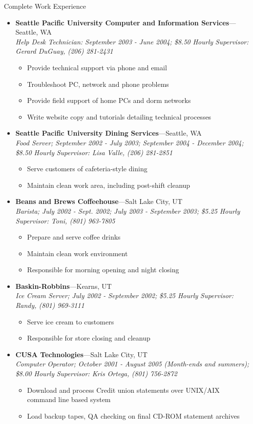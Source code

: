 \documentclass[11pt,oneside]{article}
\newenvironment{ressection}[1]{
    \vspace{4pt}
    {\fontfamily{phv}\selectfont\Large#1}
    \begin{itemize}
    \vspace{3pt}
}{
    \end{itemize}
}
\newcommand{\ressubitem}[1]{
    \vspace{-1pt}
    \item \begin{flushleft} #1 \end{flushleft}
}
\newenvironment{ressubsec}[4]{
    \item
    \textbf{#1}---#2 \\
    \textit{#3}
    \newline
    \textit{#4}
    \vspace{-2pt}
    \begin{itemize}
}{
    \end{itemize}
}
\begin{document}
\begin{ressection}{Complete Work Experience}
    \begin{ressubsec}{Seattle Pacific University Computer and Information Services}{Seattle, WA}{Help Desk Technician: September 2003 - June 2004; \$8.50 Hourly}{Supervisor: Gerard DuGuay, (206) 281-2431}
        \ressubitem{Provide technical support via phone and email}
        \ressubitem{Troubleshoot PC, network and phone problems}
        \ressubitem{Provide field support of home PCs and dorm networks}
        \ressubitem{Write website copy and tutorials detailing technical processes}
    \end{ressubsec}

    \begin{ressubsec}{Seattle Pacific University Dining Services}{Seattle, WA}{Food Server; September 2002 - July 2003; September 2004 - December 2004; \$8.50 Hourly}{Supervisor: Lisa Valle, (206) 281-2851}
        \ressubitem{Serve customers of cafeteria-style dining}
        \ressubitem{Maintain clean work area, including post-shift cleanup}
    \end{ressubsec}

    \begin{ressubsec}{Beans and Brews Coffeehouse}{Salt Lake City, UT}{Barista; July 2002 - Sept. 2002; July 2003 - September 2003; \$5.25 Hourly}{Supervisor: Toni, (801) 963-7805}
        \ressubitem{Prepare and serve coffee drinks}
        \ressubitem{Maintain clean work environment}
        \ressubitem{Responsible for morning opening and night closing}
    \end{ressubsec}

    \begin{ressubsec}{Baskin-Robbins}{Kearns, UT}{Ice Cream Server; July 2002 - September 2002; \$5.25 Hourly}{Supervisor: Randy, (801) 969-3111}
        \ressubitem{Serve ice cream to customers}
        \ressubitem{Responsible for store closing and cleanup}
    \end{ressubsec}

    \begin{ressubsec}{CUSA Technologies}{Salt Lake City, UT}{Computer Operator; October 2001 - August 2005 (Month-ends and summers); \$8.00 Hourly}{Supervisor: Kris Ortega, (801) 756-2872}
        \ressubitem{Download and process Credit union statements over UNIX/AIX command line based system}
        \ressubitem{Load backup tapes, QA checking on final CD-ROM statement archives}
    \end{ressubsec}

\end{ressection}
\end{document}
